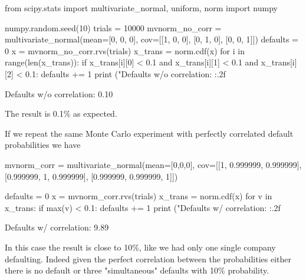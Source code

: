 \begin{ipython}
from scipy.stats import multivariate_normal, uniform, norm
import numpy

numpy.random.seed(10)
trials = 10000
mvnorm_no_corr = multivariate_normal(mean=[0, 0, 0], cov=[[1, 0, 0],
                                                          [0, 1, 0],
                                                          [0, 0, 1]])
defaults = 0
x = mvnorm_no_corr.rvs(trials)
x_trans = norm.cdf(x)
for i in range(len(x_trans)):
    if x_trans[i][0] < 0.1 and x_trans[i][1] < 0.1 and x_trans[i][2] < 0.1:
        defaults += 1
print ("Defaults w/o correlation: {:.2f}%
\end{ipython}
\begin{ioutput}
Defaults w/o correlation: 0.10%
\end{ioutput}
\noindent
The result is 0.1\% as expected.

If we repeat the same Monte Carlo experiment with perfectly correlated default probabilities we have

\begin{ipython}
mvnorm_corr = multivariate_normal(mean=[0,0,0], 
                                  cov=[[1, 0.999999, 0.999999],
                                       [0.999999, 1, 0.999999],
                                       [0.999999, 0.999999, 1]])

defaults = 0
x = mvnorm_corr.rvs(trials)
x_trans = norm.cdf(x)
for v in x_trans:
    if max(v) < 0.1:
        defaults += 1
print ("Defaults w/ correlation: {:.2f}%
\end{ipython}
\begin{ioutput}
Defaults w/ correlation: 9.89%
\end{ioutput}
In this case the result is close to 10\%, like we had only one single company defaulting. 
Indeed given the perfect correlation between the probabilities either there is no default or three "simultaneous" defaults with 10\% probability.

